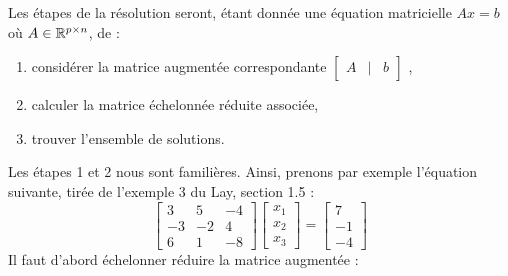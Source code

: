 \noindent Les étapes de la résolution seront, étant donnée une équation matricielle $Ax = b$ où $A \in \mathbb{R}^{p \times n}$, de :
\begin{enumerate}
    \item considérer la matrice augmentée correspondante $\begin{bmatrix}
A & | & b
\end{bmatrix}$ ,
\item calculer la matrice échelonnée réduite associée,
\item trouver l'ensemble de solutions.
\end{enumerate}
Les étapes 1 et 2 nous sont familières. Ainsi, prenons par exemple l'équation suivante, tirée de l'exemple 3 du Lay, section 1.5 :
$$
\begin{bmatrix}
3 & 5 & -4 \\
-3 & -2 & 4\\
6 & 1 & -8
\end{bmatrix}
\begin{bmatrix}
x_1 \\ x_2 \\ x_3
\end{bmatrix}
=
\begin{bmatrix}
7 \\ -1 \\ -4
\end{bmatrix}
$$
Il faut d'abord échelonner réduire la matrice augmentée :
